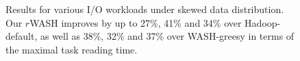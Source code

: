 \documentclass[conference]{IEEEtran}
\begin{document}

\begin{figure}[!t]
	\centering
	\quad\quad %
	\quad\quad
	\vspace{-1ex}
	\caption{Results for various I/O workloads under skewed data distribution. Our $r$WASH improves by up to 27\%, 41\% and 34\% over Hadoop-default, as well as 38\%, 32\% and 37\% over WASH-greesy in terms of the maximal task reading time.
	}
	\label{Fig:unbalance}
	\vspace{-0.35cm}
\end{figure}

\end{document}
